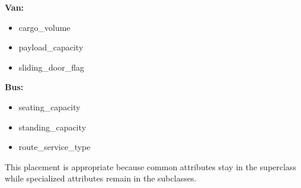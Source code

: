 \documentclass[12pt,a4paper]{article}
\begin{document}
\textbf{Van:}
\begin{itemize}[leftmargin=1.5em]
    \item cargo\_volume
    \item payload\_capacity
    \item sliding\_door\_flag
\end{itemize}

\textbf{Bus:}
\begin{itemize}[leftmargin=1.5em]
    \item seating\_capacity
    \item standing\_capacity
    \item route\_service\_type
\end{itemize}

This placement is appropriate because common attributes stay in the superclass while specialized attributes remain in the subclasses.
\end{document}
